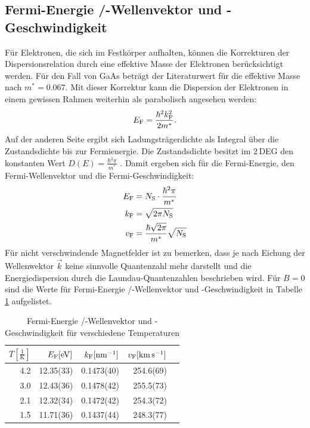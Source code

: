 \documentclass[paper=a4,fontsize=10pt,DIV=18,twocolumn,parskip=half]{scrartcl}
\numberwithin{equation}{section}    %
\begin{document}
\subsection{Fermi-Energie /-Wellenvektor und -Geschwindigkeit}
\label{a5}
Für Elektronen, die sich im Festkörper aufhalten, können die Korrekturen der Dispersionsrelation durch eine effektive Masse der Elektronen berücksichtigt werden. Für den Fall von GaAs beträgt der Literaturwert für die effektive Masse nach \cite{saarland} $m^*=0.067$. Mit dieser Korrektur kann die Dispersion der Elektronen in einem gewissen Rahmen weiterhin als parabolisch angesehen werden:
\begin{equation}
E_{\rm F}=\frac{\hbar^2 k_{\rm F}^2}{2 m^*}.
\end{equation}
Auf der anderen Seite ergibt sich Ladungsträgerdichte als Integral über die Zustandsdichte bis zur Fermienergie. Die Zustandsdichte besitzt im 2\,DEG den konstanten Wert $D(E)=\frac{\hbar^2 \pi}{m^*}$ \citep{anleitung}.
Damit ergeben sich für die Fermi-Energie, den Fermi-Wellenvektor und die Fermi-Geschwindigkeit:
\begin{align}
E_{\rm F}&=N_\mathrm{S} \cdot \frac{\hbar^2 \pi}{m^*}\\
k_{\rm F}&=\sqrt{2 \pi N_\mathrm{S}}\\
v_{\rm F}&=\frac{\hbar\sqrt{2 \pi}}{m^*} \sqrt{N_\mathrm{S}}
\end{align}
Für nicht verschwindende Magnetfelder ist zu bemerken, dass je nach Eichung der Wellenwektor $\vec{k}$ keine sinnvolle Quantenzahl mehr darstellt und die Energiedispersion durch die Laundau-Quantenzahlen beschrieben wird.
Für $B=0$ sind die Werte für Fermi-Energie /-Wellenvektor und -Geschwindigkeit in Tabelle \ref{fermitabelle} aufgelistet.

\begin{table}[htp]
	\begin{center}
		\begin{tabular}{rrrrr}
			\hline
			$T[\frac{1}{\mathrm{K}}]$ & $E_{\rm F}[\mathrm{eV}]$ & $k_{\rm F}[\SI{}{\per\nano\meter}]$ & $v_{\rm F}[\SI{}{\kilo\meter\per\second}]$\\
			\hline
			4.2 &12.35(33)	&0.1473(40)&	254.6(69)\\
			3.0 &12.43(36)	&0.1478(42)&	255.5(73)\\
			2.1 &12.32(34)	&0.1472(42)&	254.3(72)\\
			1.5 &11.71(36)	&0.1437(44)&	248.3(77)\\
			\hline
		\end{tabular}
		\caption{Fermi-Energie /-Wellenvektor und -Geschwindigkeit für verschiedene Temperaturen}
		\label{fermitabelle}
	\end{center}
\end{table}
%
~~~~~~~~~~~~~~~~~~~~~~~~~~~~~~~~~~~~~~~~~~~~~~~~~~~~~~~~~~~~~~~~~~~~~~~~~~~~~
\end{document}

